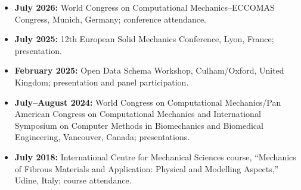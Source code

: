 \begin{itemize}
  \item \textbf{July 2026:} World Congress on Computational Mechanics--ECCOMAS Congress, Munich, Germany; conference attendance.
  \item \textbf{July 2025:} 12th European Solid Mechanics Conference, Lyon, France; presentation.
  \item \textbf{February 2025:} Open Data Schema Workshop, Culham/Oxford, United Kingdom; presentation and panel participation.
  \item \textbf{July--August 2024:} World Congress on Computational Mechanics/Pan American Congress on Computational Mechanics and International Symposium on Computer Methods in Biomechanics and Biomedical Engineering, Vancouver, Canada; presentations.
  \item \textbf{July 2018:} International Centre for Mechanical Sciences course, ``Mechanics of Fibrous Materials and Application: Physical and Modelling Aspects,'' Udine, Italy; course attendance.
\end{itemize}
